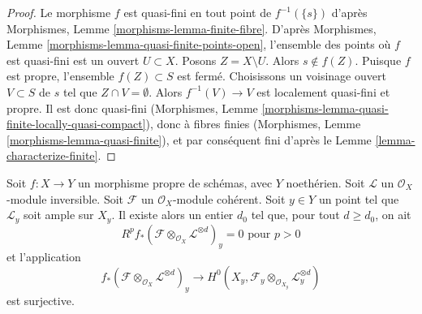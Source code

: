 \begin{proof}
Le morphisme $f$ est quasi-fini en tout point de $f^{-1}(\{s\})$
d'après Morphismes, Lemme \ref{morphisms-lemma-finite-fibre}.
D'après Morphismes, Lemme \ref{morphisms-lemma-quasi-finite-points-open},
l'ensemble des points où $f$ est quasi-fini est un ouvert $U \subset X$.
Posons $Z = X \setminus U$. Alors $s \not \in f(Z)$. Puisque $f$ est propre,
l'ensemble $f(Z) \subset S$ est fermé. Choisissons un voisinage ouvert
$V \subset S$ de $s$ tel que $Z \cap V = \emptyset$. Alors
$f^{-1}(V) \to V$ est localement quasi-fini et propre.
Il est donc quasi-fini
(Morphismes, Lemme \ref{morphisms-lemma-quasi-finite-locally-quasi-compact}),
donc à fibres finies
(Morphismes, Lemme \ref{morphisms-lemma-quasi-finite}), et par conséquent
fini d'après le Lemme \ref{lemma-characterize-finite}.
\end{proof}

\begin{lemma}
\label{lemma-ample-on-fibre}
Soit $f : X \to Y$ un morphisme propre de schémas, avec $Y$ noethérien.
Soit $\mathcal{L}$ un $\mathcal{O}_X$-module inversible.
Soit $\mathcal{F}$ un $\mathcal{O}_X$-module cohérent.
Soit $y \in Y$ un point tel que $\mathcal{L}_y$ soit ample sur $X_y$.
Il existe alors un entier $d_0$ tel que, pour tout $d \geq d_0$, on ait
$$
R^pf_*(\mathcal{F} \otimes_{\mathcal{O}_X} \mathcal{L}^{\otimes d})_y = 0
\text{ pour }p > 0
$$
et l'application
$$
f_*(\mathcal{F} \otimes_{\mathcal{O}_X} \mathcal{L}^{\otimes d})_y
\longrightarrow
H^0(X_y, \mathcal{F}_y \otimes_{\mathcal{O}_{X_y}} \mathcal{L}_y^{\otimes d})
$$
est surjective.
\end{lemma}

